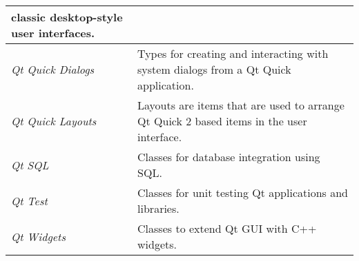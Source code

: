 \begin{frame}
\begin{columns}
\begin{column}{0.48\textwidth}
\begin{tabular}{|p{}|p{}|}
        classic desktop-style user interfaces. \\
      \hline
      {\em  Qt Quick Dialogs} & Types for creating and interacting with system
        dialogs from a Qt Quick application. \\
      \hline
      {\em  Qt Quick Layouts} & Layouts are items that are used to arrange
        Qt Quick 2 based items in the user interface. \\
      \hline
      {\em  Qt SQL} & Classes for database integration using SQL. \\
      \hline
      {\em  Qt Test} & Classes for unit testing Qt applications and libraries. \\
      \hline
      {\em  Qt Widgets} & Classes to extend Qt GUI with C++ widgets. \\
      \hline
      \end{tabular}
    \end{column}
  \end{columns}
\end{frame}

